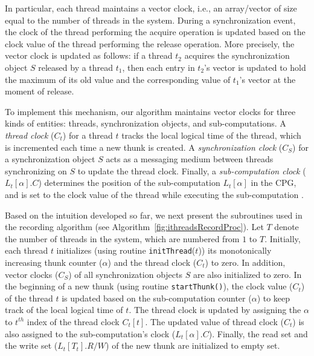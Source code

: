 In particular, each thread maintains a vector clock, i.e., an array/vector of size equal to the number of threads in the system.
During a synchronization event, the clock of the thread performing the
acquire operation is updated based on the clock value of the thread performing
the release operation.  More precisely, the vector clock is updated as follows: if a thread $t_2$ acquires the synchronization
object $S$ released by a thread $t_1$, then each entry in $t_2$'s vector is
updated to hold the maximum of its old value and the corresponding value of
$t_1$'s vector at the moment of release.



To implement this mechanism, our algorithm maintains vector clocks for three kinds of
entities: threads,  synchronization objects, and sub-computations.  A {\em thread clock}
($C_t$) for a thread $t$ tracks the local logical time of the thread, which is
incremented each time a new thunk is created. A {\em synchronization clock}
($C_S$) for a synchronization object $S$ acts as a messaging medium  between
threads synchronizing on $S$ to update the thread clock. Finally, a {\em  sub-computation clock}
($L_t[\alpha].C$) determines the position of the sub-computation $L_t[\alpha]$
in the CPG, and is set to the clock value of the thread while executing the
sub-computation .



Based on the intuition developed so far, we next present the
subroutines used in the recording algorithm (see
Algorithm~\ref{fig:ithreadsRecordProc}). Let $T$ denote the number of threads in the system, which are numbered from $1$ to $T$.  Initially, each thread $t$ initializes (using routine {\tt initThread}($t$)) its monotonically increasing thunk
counter ($\alpha$) and the thread clock ($C_t$) to zero. In addition, vector clocks ($C_S$) of all synchronization objects $S$ are also initialized to zero.
In the beginning of a new thunk (using routine {\tt startThunk()}), the clock value ($C_t$) of the thread $t$ is
updated based on the sub-computation  counter ($\alpha$) to keep track of the local logical time of $t$. The thread clock is updated by assigning the $\alpha$ to $t^{th}$ index of the thread clock $C_t[t]$. The updated value of thread clock ($C_t$)   is also assigned to the sub-computation's clock ($L_t[\alpha].C$). Finally, the read set and the write set
($L_t[T_t].R/W$) of the new thunk are initialized to empty set.

